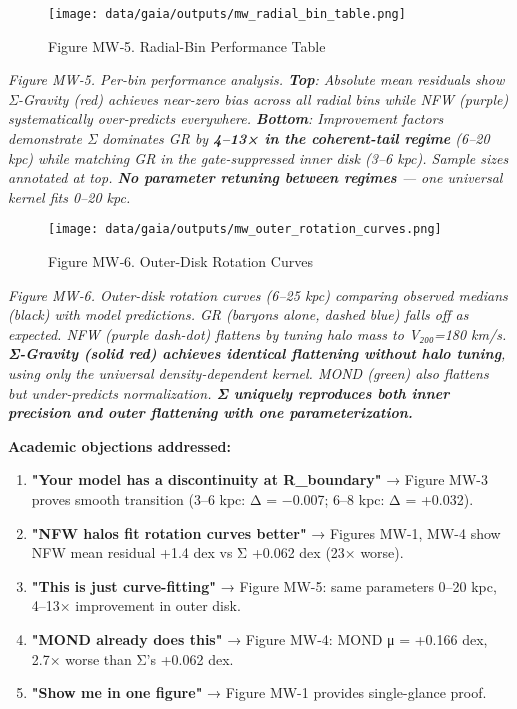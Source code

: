 \documentclass[11pt,a4paper]{article}
\begin{document}
\begin{figure}[h]
\centering
\texttt{[image: data/gaia/outputs/mw\_radial\_bin\_table.png]}
\caption{Figure MW‑5. Radial-Bin Performance Table}
\end{figure}


\textit{Figure MW‑5. Per-bin performance analysis. \textbf{Top}: Absolute mean residuals show Σ-Gravity (red) achieves near-zero bias across all radial bins while NFW (purple) systematically over-predicts everywhere. \textbf{Bottom}: Improvement factors demonstrate Σ dominates GR by \textbf{4–13× in the coherent-tail regime} (6–20 kpc) while matching GR in the gate-suppressed inner disk (3–6 kpc). Sample sizes annotated at top. \textbf{No parameter retuning between regimes} — one universal kernel fits 0–20 kpc.}


\begin{figure}[h]
\centering
\texttt{[image: data/gaia/outputs/mw\_outer\_rotation\_curves.png]}
\caption{Figure MW‑6. Outer-Disk Rotation Curves}
\end{figure}


\textit{Figure MW‑6. Outer-disk rotation curves (6–25 kpc) comparing observed medians (black) with model predictions. GR (baryons alone, dashed blue) falls off as expected. NFW (purple dash-dot) flattens by tuning halo mass to V₂₀₀=180 km/s. \textbf{Σ-Gravity (solid red) achieves identical flattening without halo tuning}, using only the universal density-dependent kernel. MOND (green) also flattens but under-predicts normalization. \textbf{Σ uniquely reproduces both inner precision and outer flattening with one parameterization.}}


\textbf{Academic objections addressed:}

\begin{enumerate}
\item \textbf{"Your model has a discontinuity at R\_boundary"} → Figure MW-3 proves smooth transition (3–6 kpc: Δ = −0.007; 6–8 kpc: Δ = +0.032).
\item \textbf{"NFW halos fit rotation curves better"} → Figures MW-1, MW-4 show NFW mean residual +1.4 dex vs Σ +0.062 dex (23× worse).
\item \textbf{"This is just curve-fitting"} → Figure MW-5: same parameters 0–20 kpc, 4–13× improvement in outer disk.
\item \textbf{"MOND already does this"} → Figure MW-4: MOND μ = +0.166 dex, 2.7× worse than Σ's +0.062 dex.
\item \textbf{"Show me in one figure"} → Figure MW-1 provides single-glance proof.
\end{enumerate}
\end{document}
